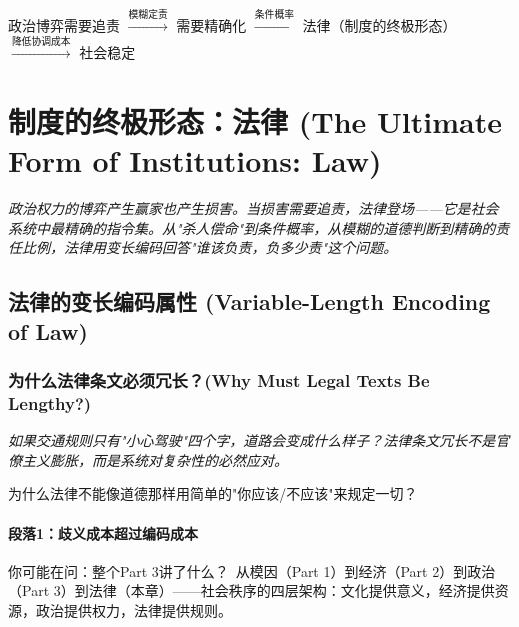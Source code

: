 \documentclass[a4paper,12pt]{book}
\newenvironment{motivation}{\begin{tcolorbox}[colback=gray!10,colframe=gray!60,title=\textit{动机}]\small\itshape}{\end{tcolorbox}}
\newenvironment{questionbox}{\begin{tcolorbox}[colback=red!3!white,colframe=red!60!black]}{\end{tcolorbox}}
\begin{document}
	\begin{logicmap}
		政治博弈需要追责 $\xrightarrow{\text{模糊定责}}$ 需要精确化 $\xrightarrow{\text{条件概率}}$ 法律（制度的终极形态）$\xrightarrow{\text{降低协调成本}}$ 社会稳定
	\end{logicmap}

	\chapter{制度的终极形态：法律 (The Ultimate Form of Institutions: Law)}
	\begin{motivation}
		政治权力的博弈产生赢家也产生损害。当损害需要追责，法律登场——它是社会系统中最精确的指令集。从"杀人偿命"到条件概率，从模糊的道德判断到精确的责任比例，法律用变长编码回答"谁该负责，负多少责"这个问题。
	\end{motivation}

	\section{法律的变长编码属性 (Variable-Length Encoding of Law)}

	\subsection{为什么法律条文必须冗长？(Why Must Legal Texts Be Lengthy?)}
	\begin{motivation}
		如果交通规则只有"小心驾驶"四个字，道路会变成什么样子？法律条文冗长不是官僚主义膨胀，而是系统对复杂性的必然应对。
	\end{motivation}
	\begin{questionbox}
		为什么法律不能像道德那样用简单的"你应该/不应该"来规定一切？
	\end{questionbox}

	\subsubsection*{段落1：歧义成本超过编码成本}

	\begin{tcolorbox}[colback=yellow!5, title=\textit{读者行为预测}]
		你可能在问：整个Part 3讲了什么？\ 从模因（Part 1）到经济（Part 2）到政治（Part 3）到法律（本章）——社会秩序的四层架构：文化提供意义，经济提供资源，政治提供权力，法律提供规则。
	\end{tcolorbox}
\end{document}
